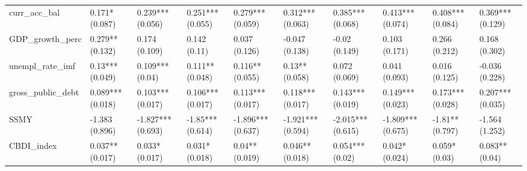 \begin{table}[ht]
\begin{tabular}{llllllllll}
  curr\_acc\_bal & 0.171* (0.087) & 0.239*** (0.056) & 0.251*** (0.055) & 0.279*** (0.059) & 0.312*** (0.063) & 0.385*** (0.068) & 0.413*** (0.074) & 0.408*** (0.084) & 0.369*** (0.129) \\ 
  GDP\_growth\_perc & 0.279** (0.132) & 0.174 (0.109) & 0.142 (0.11) & 0.037 (0.126) & -0.047 (0.138) & -0.02 (0.149) & 0.103 (0.171) & 0.266 (0.212) & 0.168 (0.302) \\ 
  unempl\_rate\_imf & 0.13*** (0.049) & 0.109*** (0.04) & 0.111** (0.048) & 0.116** (0.055) & 0.13** (0.058) & 0.072 (0.069) & 0.041 (0.093) & 0.016 (0.125) & -0.036 (0.228) \\ 
  gross\_public\_debt & 0.089*** (0.018) & 0.103*** (0.017) & 0.106*** (0.017) & 0.113*** (0.017) & 0.118*** (0.017) & 0.143*** (0.019) & 0.149*** (0.023) & 0.173*** (0.028) & 0.207*** (0.035) \\ 
  SSMY & -1.383 (0.896) & -1.827*** (0.693) & -1.85*** (0.614) & -1.896*** (0.637) & -1.921*** (0.594) & -2.015*** (0.615) & -1.809*** (0.675) & -1.81** (0.797) & -1.564 (1.252) \\ 
  CBDI\_index & 0.037** (0.017) & 0.033* (0.017) & 0.031* (0.018) & 0.04** (0.019) & 0.046** (0.018) & 0.054*** (0.02) & 0.042* (0.024) & 0.059* (0.03) & 0.083** (0.04) \\ 
   \bottomrule
\end{tabular}
\endgroup
\end{table}
